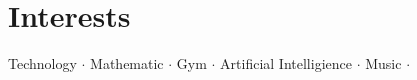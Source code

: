 \section{Interests}

Technology $\cdot$ Mathematic $\cdot$ Gym $\cdot$ Artificial Intelligience $\cdot$ Music $\cdot$ 